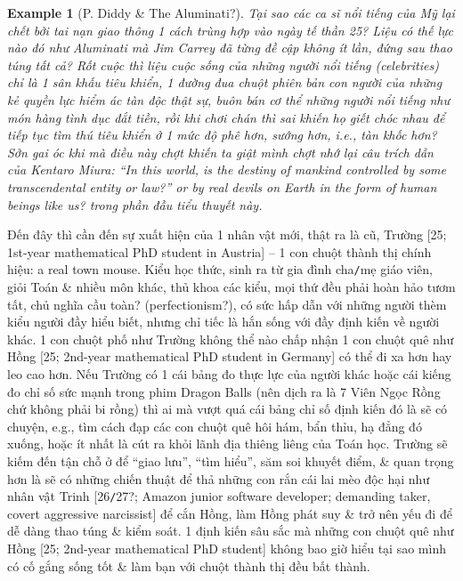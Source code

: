 \documentclass[12pt]{article}
\newtheorem{example}{Example}
\begin{document}
\begin{example}[P. Diddy \& The Aluminati?]
	Tại sao các ca sĩ nổi tiếng của Mỹ lại chết bởi tai nạn giao thông 1 cách trùng hợp vào ngày tế thần 25? Liệu có thế lực nào đó như Aluminati mà {\sc Jim Carrey} đã từng đề cập không ít lần, đứng sau thao túng tất cả? Rốt cuộc thì liệu cuộc sống của những người nổi tiếng (celebrities) chỉ là 1 sân khấu tiêu khiển, 1 đường đua chuột phiên bản con người của những kẻ quyền lực hiểm ác tàn độc thật sự, buôn bán cơ thể những người nổi tiếng như món hàng tình dục đắt tiền, rồi khi chơi chán thì sai khiến họ giết chóc nhau để tiếp tục tìm thú tiêu khiển ở 1 mức độ phê hơn, sướng hơn, i.e., tàn khốc hơn? Sởn gai óc khi mà điều này chợt khiến ta giật mình chợt nhớ lại câu trích dẫn của {\sc Kentaro Miura}: ``In this world, is the destiny of mankind controlled by some transcendental entity or law?'' or by real devils on Earth in the form of human beings like us? trong phần đầu tiểu thuyết này.
\end{example}
Đến đây thì cần đến sự xuất hiện của 1 nhân vật mới, thật ra là cũ, {\sf Trường [25; 1st-year mathematical PhD student in Austria]} -- 1 con chuột thành thị chính hiệu: a real town mouse. Kiểu học thức, sinh ra từ gia đình cha{\tt/}mẹ giáo viên, giỏi Toán \& nhiều môn khác, thủ khoa các kiểu, mọi thứ đều phải hoàn hảo tươm tất, chủ nghĩa cầu toàn? (perfectionism?), có sức hấp dẫn với những người thèm kiểu người đầy hiểu biết, nhưng chỉ tiếc là hắn sống với đầy định kiến về người khác. 1 con chuột phố như Trường không thể nào chấp nhận 1 con chuột quê như {\sf Hồng [25; 2nd-year mathematical PhD student in Germany]} có thể đi xa hơn hay leo cao hơn. Nếu Trường có 1 cái bảng đo thực lực của người khác hoặc cái kiếng đo chỉ số sức mạnh trong phim Dragon Balls (nên dịch ra là 7 Viên Ngọc Rồng chứ không phải bi rồng) thì ai mà vượt quá cái bảng chỉ số định kiến đó là sẽ có chuyện, e.g., tìm cách đạp các con chuột quê hôi hám, bẩn thỉu, hạ đẳng đó xuống, hoặc ít nhất là cút ra khỏi lãnh địa thiêng liêng của Toán học. Trường sẽ kiếm đến tận chỗ ở để ``giao lưu'', ``tìm hiểu'', săm soi khuyết điểm, \& quan trọng hơn là sẽ có những chiến thuật để thả những con rắn cái lai mèo độc hại như nhân vật {\sf Trinh [26{\tt/}27?; Amazon junior software developer; demanding taker, covert aggressive narcissist]} để cắn Hồng, làm Hồng phát suy \& trở nên yếu đi để dễ dàng thao túng \& kiểm soát. 1 định kiến sâu sắc mà những con chuột quê như {\sf Hồng [25; 2nd-year mathematical PhD student]} không bao giờ hiểu tại sao mình có cố gắng sống tốt \& làm bạn với chuột thành thị đều bất thành.
\end{document}
